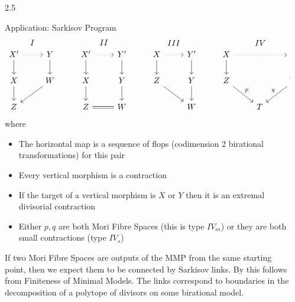 \documentclass[final]{beamer}
\newlength{\sepwidth}
\newlength{\colwidth}
\newcommand{\separatorcolumn}{\begin{column}{\sepwidth}\end{column}}
\begin{document}
\begin{frame}[t, fragile]
\begin{columns}[t]
\begin{column}{2.5\colwidth}
\begin{block}{Application: Sarkisov Program}
				\[\begin{tikzcd}
				X' \arrow[d] \arrow[r, dotted] \arrow[r, "I", phantom, bend left=49] & Y \arrow[d]  & X' \arrow[r, dotted] \arrow[d] \arrow[r, "II",phantom, bend left=49] & Y' \arrow[d] & X \arrow[r, dotted] \arrow[d] \arrow[r, "III", phantom, bend left=49] & Y' \arrow[d] & X \arrow[d] \arrow[rr, dotted] \arrow[rr, "IV",phantom, bend left] &   & Y \arrow[d]       \\
				X \arrow[d]                                                          & W \arrow[ld] & X \arrow[d]                                               & Y \arrow[d]  & Z \arrow[rd]                                              & Y \arrow[d]  & Z \arrow[rd, "p"]                                          &   & W \arrow[ld, "q"'] \\
				Z                                                                    &              & Z \arrow[r, equal]                                                         & W            &                                                           & W            &                                                            & T &                  
				\end{tikzcd} \]
				where
				\begin{itemize}
					\item The horizontal map is a sequence of flops (codimension 2 birational transformations) for this pair
					\item Every vertical morphism is a contraction
					\item If the target of a vertical morphism is $X$ or $Y$ then it is an extremal divisorial contraction
					\item Either $p,q$ are both Mori Fibre Spaces (this is type $IV_{m}$) or they are both small contractions (type $IV_{s}$)
				\end{itemize}
				
			\end{block}
			
			If two Mori Fibre Spaces are outputs of the MMP from the same starting point, then we expect them to be connected by Sarkisov links. By \cite{hacon2009sarkisov} this follows from Finiteness of Minimal Models. The links correspond to boundaries in the decomposition of a polytope of divisors on some birational model.
			
			
			
		\end{column}
		
		\separatorcolumn
	\end{columns}
\end{frame}
\end{document}
